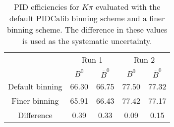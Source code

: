 \begin{table}
    \centering
    \begin{tabular}{ccccc}
    \toprule
& \multicolumn{2}{c}{Run 1} & \multicolumn{2}{c}{Run 2}\\
& $B^0$ & $\bar{B}^0$ & $B^0$ & $\bar{B}^0$\\
    \midrule
Default binning & 66.30 & 66.75 & 77.50 & 77.32\\
Finer binning & 65.91 & 66.43 & 77.42 & 77.17\\
Difference & 0.39 & 0.33 & 0.09 & 0.15\\
    \bottomrule
    \end{tabular}
    \caption{PID efficiencies for $K\pi$ evaluated with the default PIDCalib binning scheme and a finer binning scheme. The difference in these values is used as the systematic uncertainty.}
\label{tab:final_PID_Kpi}
\end{table}
